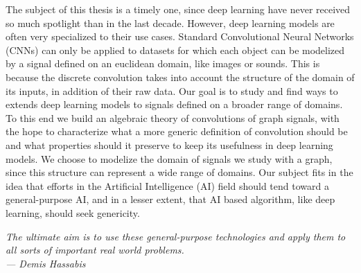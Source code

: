 The subject of this thesis is a timely one, since deep learning have never received so much spotlight than in the last decade. However, deep learning models are often very specialized to their use cases. Standard Convolutional Neural Networks (CNNs) can only be applied to datasets for which each object can be modelized by a signal defined on an euclidean domain, like images or sounds. This is because the discrete convolution takes into account the structure of the domain of its inputs, in addition of their raw data. Our goal is to study and find ways to extends deep learning models to signals defined on a broader range of domains. To this end we build an algebraic theory of convolutions of graph signals, with the hope to characterize what a more generic definition of convolution should be and what properties should it preserve to keep its usefulness in deep learning models. We choose to modelize the domain of signals we study with a graph, since this structure can represent a wide range of domains. Our subject fits in the idea that efforts in the Artificial Intelligence (AI) field should tend toward a general-purpose AI, and in a lesser extent, that AI based algorithm, like deep learning, should seek genericity.

\begin{displayquote}
\begin{flushright}
\emph{The ultimate aim is to use these general-purpose technologies and apply them to all sorts of important real world problems.\\
--- Demis Hassabis}
\end{flushright}
\end{displayquote}


